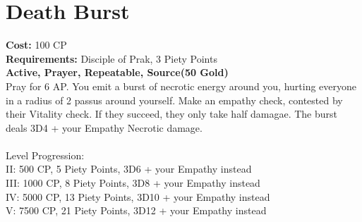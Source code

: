 \section{Death Burst}
\textbf{Cost:} 100 CP\\
\textbf{Requirements:} Disciple of Prak, 3 Piety Points \\
\textbf{Active, Prayer, Repeatable, Source(50 Gold)}\\
Pray for 6 AP. You emit a burst of necrotic energy around you, hurting everyone in a radius of 2 passus around yourself. Make an empathy check, contested by their Vitality check. If they succeed, they only take half damagae. The burst deals 3D4 + your Empathy Necrotic damage.\\
\\
Level Progression:\\
II: 500 CP, 5 Piety Points, 3D6 + your Empathy instead\\
III: 1000 CP, 8 Piety Points, 3D8 + your Empathy instead\\
IV: 5000 CP, 13 Piety Points, 3D10 + your Empathy instead\\
V: 7500 CP, 21 Piety Points, 3D12 + your Empathy instead\\